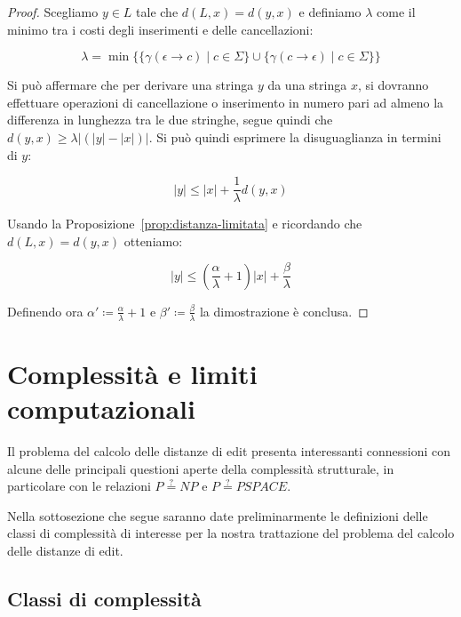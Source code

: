 \documentclass[a4paper,12pt]{report}
\theoremstyle{propositionstyle}
\begin{document}
    \begin{proof}
        Scegliamo $y \in L$ tale che $d\left(L, x\right) = d\left(y, x\right)$ e definiamo $\lambda$ come il minimo tra i costi degli inserimenti e delle cancellazioni:

        $$ \lambda = \min\bigl\{\{\gamma\left(\epsilon \rightarrow c\right) \mid c \in \Sigma\} \cup \{\gamma\left(c \rightarrow \epsilon\right) \mid c \in \Sigma\}\bigr\}$$

        Si può affermare che per derivare una stringa $y$ da una stringa $x$, si dovranno effettuare operazioni di cancellazione o inserimento in numero pari
        ad almeno la differenza in lunghezza tra le due stringhe, segue quindi che $d\left(y, x\right) \geq \lambda\bigl|\left(\lvert y \rvert - \lvert x \rvert\right)\bigr|$.
        Si può quindi esprimere la disuguaglianza in termini di $y$:

        $$\lvert y \rvert \leq \lvert x \rvert + \frac{1}{\lambda}d\left(y, x\right)$$

        Usando la Proposizione~\ref{prop:distanza-limitata} e ricordando che $d\left(L, x\right) = d\left(y, x\right)$ otteniamo:

        $$\lvert y \rvert \leq \left(\frac{\alpha}{\lambda} + 1\right)\lvert x \rvert + \frac{\beta}{\lambda}$$
        \vspace{0.5em}

        Definendo ora $\displaystyle \alpha' \coloneqq \frac{\alpha}{\lambda} + 1$ e $\displaystyle \beta' \coloneqq \frac{\beta}{\lambda}$ la dimostrazione è conclusa.
    \end{proof}


    \section{Complessità e limiti computazionali}

    Il problema del calcolo delle distanze di edit presenta interessanti connessioni con alcune delle principali questioni aperte della complessità strutturale, in particolare con le relazioni $P \stackrel{?}{=} NP$ e $P \stackrel{?}{=} PSPACE$.

    Nella sottosezione che segue saranno date preliminarmente le definizioni delle classi di complessità di interesse per la nostra trattazione del problema del calcolo delle distanze di edit.

    \subsection{Classi di complessità}
\end{document}
